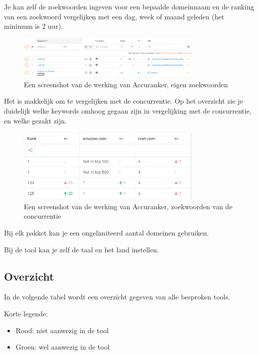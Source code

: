 Je kan zelf de zoekwoorden ingeven voor een bepaalde domeinnaam en de ranking van een zoekwoord vergelijken met een dag, week of maand geleden (het minimum is 2 uur). 

\begin{figure}[h!]
\centering
\includegraphics[width=0.8\textwidth]{img/accuranker.PNG}
\caption{Een screenshot van de werking van Accuranker, eigen zoekwoorden
\autocite{accuranker}}
\end{figure}

Het is makkelijk om te vergelijken met de concurrentie. Op het overzicht zie je duidelijk welke keywords omhoog gegaan zijn in vergelijking met de concurrentie, en welke gezakt zijn. 

\begin{figure}[h!]
\centering
\includegraphics[width=0.8\textwidth]{img/accurankercompetitie.PNG}
\caption{Een screenshot van de werking van Accuranker, zoekwoorden van de concurrentie
\autocite{accuranker}}
\end{figure}

Bij elk pakket kan je een ongelimiteerd aantal domeinen gebruiken. 

Bij de tool kan je zelf de taal en het land instellen. 

\subsection{Overzicht}
\label{ch: Overzicht}

In de volgende tabel wordt een overzicht gegeven van alle besproken tools. 

Korte legende: 
\begin{itemize}
\item Rood: niet aanwezig in de tool
\item Groen: wel aanwezig in de tool
\end{itemize}

